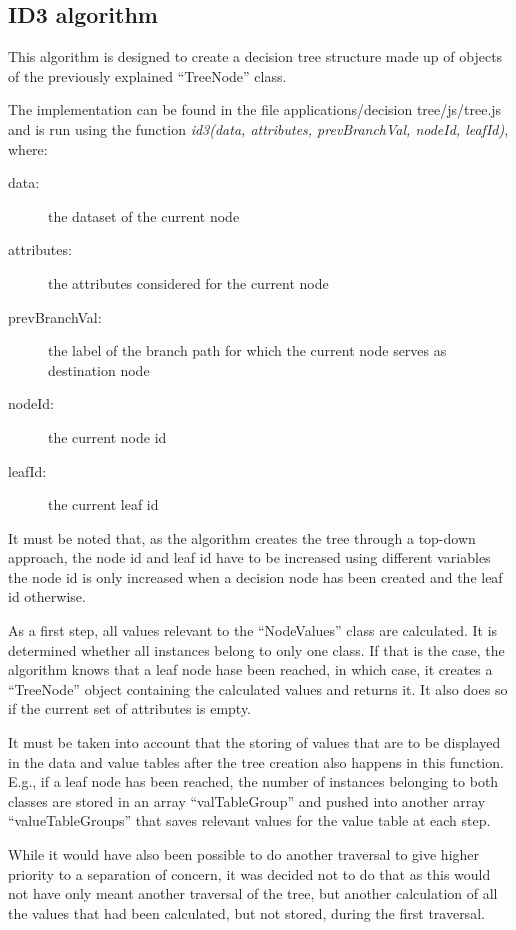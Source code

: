 \subsection{ID3 algorithm}
This algorithm is designed to create a decision tree structure made up of objects of the previously explained ``TreeNode'' class. 

The implementation can be found in the file applications/decision tree/js/tree.js and is run using the function \textit{id3(data, attributes, prevBranchVal, nodeId, leafId)}, where:
\begin{description}
    \item[data:] the dataset of the current node
    \item[attributes:] the attributes considered for the current node
    \item[prevBranchVal:] the label of the branch path for which the current node serves as destination node
    \item[nodeId:] the current node id
    \item[leafId:] the current leaf id 
\end{description}
It must be noted that, as the algorithm creates the tree through a top-down approach, the node id and leaf id have to be increased using different variables the node id is only increased when a decision node has been created and the leaf id otherwise.

As a first step, all values relevant to the ``NodeValues'' class are calculated. It is determined whether all instances belong to only one class. If that is the case, the algorithm knows that a leaf node hase been reached, in which case, it creates a ``TreeNode'' object containing the calculated values and returns it. It also does so if the current set of attributes is empty.

It must be taken into account that the storing of values that are to be displayed in the data and value tables after the tree creation also happens in this function. E.g., if a leaf node has been reached, the number of instances belonging to both classes are stored in an array ``valTableGroup'' and pushed into another array ``valueTableGroups'' that saves relevant values for the value table at each step.

While it would have also been possible to do another traversal to give higher priority to a separation of concern, it was decided not to do that as this would not have only meant another traversal of the tree, but another calculation of all the values that had been calculated, but not stored, during the first traversal.

